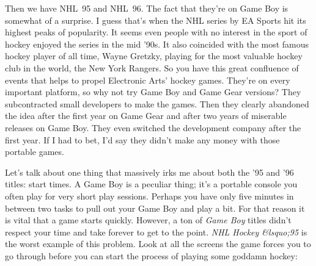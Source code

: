 \documentclass{book}
\let\oldcenter\center
\let\oldendcenter\endcenter
\renewenvironment{center}{\setlength\topsep{0pt}\oldcenter}{\oldendcenter}
\begin{document}
Then we have NHL~95 and NHL~96. The fact that they’re on Game Boy is somewhat of a surprise. I guess that’s when the NHL series by EA Sports hit its highest peaks of popularity. It seems even people with no interest in the sport of hockey enjoyed the series in the mid ’90s. It also coincided with the most famous hockey player of all time, Wayne Gretzky, playing for the most valuable hockey club in the world, the New York Rangers. So you have this great confluence of events that helps to propel Electronic Arts’ hockey games. They’re on every important platform, so why not try Game Boy and Game Gear versions? They subcontracted small developers to make the games. Then they clearly abandoned the idea after the first year on Game Gear and after two years of miserable releases on Game Boy. They even switched the development company after the first year. If I had to bet, I’d say they didn’t make any money with those portable games.

Let’s talk about one thing that massively irks me about both the ’95 and ’96 titles: start times. A Game Boy is a peculiar thing; it’s a portable console you often play for very short play sessions. Perhaps you have only five minutes in between two tasks to pull out your Game Boy and play a bit. For that reason it is vital that a game starts quickly. However, a ton of \emph{Game Boy} titles didn’t respect your time and take forever to get to the point. \emph{NHL Hockey &lsquo;95} is the worst example of this problem. Look at all the screens the game forces you to go through before you can start the process of playing some goddamn hockey:

\begin{center}
\quad\vspace{4pt}
\quad\vspace{4pt}
\quad\vspace{4pt}
\quad\vspace{4pt}
\quad\vspace{4pt}
\quad\vspace{4pt}
\quad\vspace{4pt}
\quad\vspace{4pt}
\quad\vspace{4pt}
\quad\vspace{4pt}
\end{center}
\end{document}
